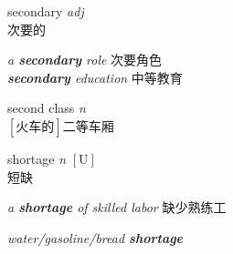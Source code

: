 \item[] {
    \lettrine{secondary}{}  
    \textit{adj} \\
    次要的
    
    \textit{a \textbf{secondary} role} 次要角色\\
    \textit{\textbf{secondary} education} 中等教育
} 

\item[] {
    \lettrine{\textsecstress second \textprimstress class}{}  
    \textit{n} \\
    $\mathrm{[\mbox{火车的}]}$二等车厢
    
} 

\item[] {
    \lettrine{shortage}{}  
    \textit{n} 
    $\mathrm{[U]}$ 
    \\
    短缺

    \textit{a \textbf{shortage} of skilled labor}
    缺少熟练工

    \textit{water/gasoline/bread \textbf{shortage}}

} 